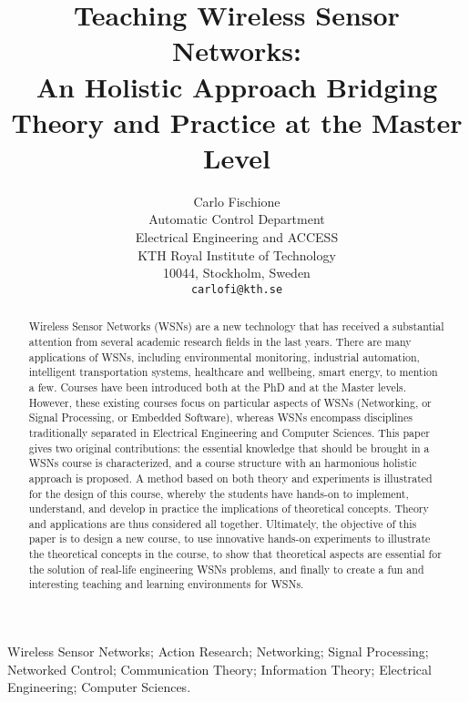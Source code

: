 \documentclass[onecolumn,12pt,draftclsnofoot,a4paper,peerreview]{IEEEtran}
\begin{document}
\title{Teaching Wireless Sensor Networks: \\ An Holistic Approach Bridging \\ Theory and Practice at the Master Level}
\author{ \parbox{3 in}{\centering Carlo Fischione\\
         Automatic Control Department\\
         Electrical Engineering and ACCESS\\
         KTH Royal Institute of Technology\\
         10044, Stockholm, Sweden\\
         {\tt\small carlofi@kth.se}}}
\vspace{-0.8cm}
\maketitle 
\vspace{-0.8cm}
\begin{abstract}
Wireless Sensor Networks (WSNs) are a new technology that has received a
substantial attention from several academic research fields in the last years. There are many applications of WSNs, including environmental monitoring, industrial automation, intelligent transportation systems, healthcare and wellbeing, smart energy, to mention a few. Courses have been introduced both at the PhD and at the Master levels. However, these existing courses focus on particular aspects of WSNs (Networking, or Signal Processing, or Embedded Software), whereas WSNs encompass disciplines traditionally separated in Electrical Engineering and Computer Sciences. This paper gives two original contributions: the essential knowledge that should be brought in a WSNs course is characterized, and a course structure with an harmonious holistic approach is proposed. A method based on both theory and experiments is illustrated for the design of this course, whereby the students have hands-on to implement, understand, and develop in practice the implications of theoretical concepts. Theory and applications are thus considered all together. Ultimately, the objective of this paper is to design a new course, to use innovative hands-on experiments to illustrate the theoretical concepts in the course, to show that theoretical aspects are essential for the solution of real-life engineering WSNs problems, and finally to create a fun and interesting teaching and learning environments for WSNs.  
\end{abstract}

\vspace{-0.8cm}
\begin{keywords}
Wireless Sensor Networks; Action Research; Networking; Signal
Processing; Networked Control; Communication Theory; Information
Theory; Electrical Engineering; Computer Sciences.
\end{keywords}
\newpage
\end{document}
